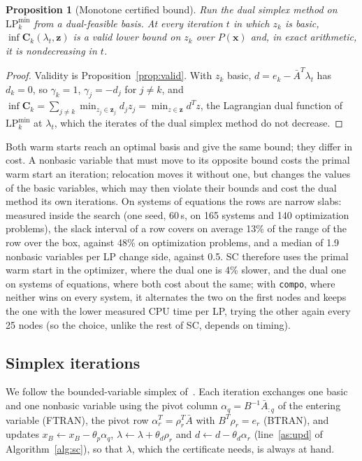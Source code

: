 \documentclass[11pt]{article}
\newcommand{\iv}[1]{\mathbf{#1}}          %
\newcommand{\Abar}{\bar{A}}
\newcommand{\inff}{\operatorname{inf}}
\newtheorem{proposition}{Proposition}
\theoremstyle{definition}
\theoremstyle{remark}
\begin{document}
\begin{proposition}[Monotone certified bound]\label{prop:mono}
Run the dual simplex method on $\mathrm{LP}_k^{\min}$ from a dual-feasible basis. At
every iteration $t$ in which $z_k$ is basic, $\inff\iv{C}_k(\lambda_t,\iv{z})$
is a valid lower bound on $z_k$ over $P(\iv{x})$ and, in exact arithmetic, it
is nondecreasing in $t$.
\end{proposition}
\begin{proof}
Validity is Proposition~\ref{prop:valid}. With $z_k$ basic, $d=e_k-\Abar^T\lambda_t$
has $d_k=0$, so $\gamma_k=1$, $\gamma_j=-d_j$ for $j\neq k$, and
$\inff\iv{C}_k=\sum_{j\neq k}\min_{z_j\in\iv{z}_j}d_jz_j=\min_{z\in\iv{z}}d^Tz$,
the Lagrangian dual function of $\mathrm{LP}_k^{\min}$ at $\lambda_t$, which the
iterates of the dual simplex method do not decrease.
\end{proof}

Both warm starts reach an optimal basis and give the same bound; they differ
in cost. A nonbasic variable that must move to its opposite bound costs the
primal warm start an iteration; relocation moves it without one, but changes
the values of the basic variables, which may then violate their bounds and
cost the dual method its own iterations. On systems of equations the rows
are narrow slabs: measured inside the search (one seed, 60\,s, on 165 systems
and 140 optimization problems), the slack interval of a row covers on average
13\% of the range of the row over the box, against 48\% on optimization
problems, and a median of 1.9 nonbasic variables per LP change side, against
0.5. SC therefore uses the primal warm start in the optimizer,
where the dual one is 4\% slower, and the dual one on systems of equations,
where both cost about the same; with \texttt{compo}, where neither wins on
every system, it alternates the two on the first nodes and keeps the one with
the lower measured CPU time per LP, trying the other again every 25 nodes
(so the choice, unlike the rest of SC, depends on timing).

\subsection{Simplex iterations}\label{sec:iter}

We follow the bounded-variable simplex of~\cite{koberstein2005dual}. Each
iteration exchanges one basic and one nonbasic variable using the pivot column
$\alpha_q = B^{-1}\Abar_{:q}$ of the entering variable (FTRAN), the pivot row
$\alpha_r^T = \rho_r^T\Abar$ with $B^T\rho_r=e_r$ (BTRAN), and updates
$x_B \leftarrow x_B - \theta_p\alpha_q$,
$\lambda \leftarrow \lambda + \theta_d\rho_r$ and
$d \leftarrow d - \theta_d\alpha_r$ (line~\ref{as:upd} of
Algorithm~\ref{alg:sc}), so that $\lambda$, which the certificate needs, is
always at hand.
\end{document}
